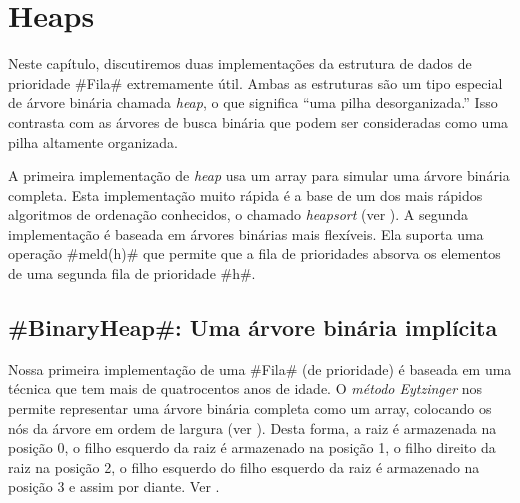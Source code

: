 \chapter{Heaps}

Neste capítulo, discutiremos duas implementações da estrutura de dados de prioridade #Fila# extremamente útil. Ambas as estruturas são um tipo especial de árvore binária chamada \emph{heap},
%
%
%
o que significa ``uma pilha desorganizada.'' Isso contrasta com as árvores de busca binária que podem ser consideradas como uma pilha altamente organizada.

A primeira implementação de \textit{heap} usa um array para simular uma árvore binária completa. Esta implementação muito rápida é a base de um dos mais rápidos algoritmos de ordenação conhecidos, o chamado \textit{heapsort} (ver ).
A segunda implementação é baseada em árvores binárias mais flexíveis.
Ela suporta uma operação #meld(h)# que permite que a fila de prioridades absorva os elementos de uma segunda fila de prioridade #h#.

\section{#BinaryHeap#: Uma árvore binária implícita}

%
Nossa primeira implementação de uma  #Fila# (de prioridade) é baseada em uma técnica que tem mais de quatrocentos anos de idade.  O \emph{método Eytzinger}
%
nos permite representar uma árvore binária completa como um array, colocando os nós da árvore em ordem de largura
(ver ).
Desta forma, a raiz é armazenada na posição 0, o filho esquerdo da raiz é armazenado na posição 1, o filho direito da raiz na posição 2, o filho esquerdo do filho esquerdo da raiz é armazenado na posição 3 e assim por diante.
Ver .

